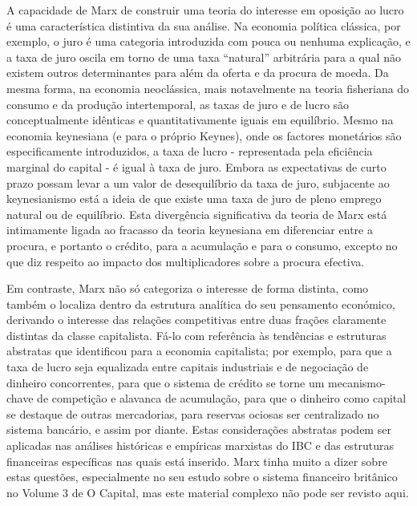  \par 
A capacidade de Marx de construir uma teoria do interesse em oposição ao lucro é uma característica distintiva da sua análise. Na economia política clássica, por exemplo, o juro é uma categoria introduzida com pouca ou nenhuma explicação, e a taxa de juro oscila em torno de uma taxa “natural” arbitrária para a qual não existem outros determinantes para além da oferta e da procura de moeda. Da mesma forma, na economia neoclássica, mais notavelmente na teoria fisheriana do consumo e da produção intertemporal, as taxas de juro e de lucro são conceptualmente idênticas e quantitativamente iguais em equilíbrio. Mesmo na economia keynesiana (e para o próprio Keynes), onde os factores monetários são especificamente introduzidos, a taxa de lucro - representada pela eficiência marginal do capital - é igual à taxa de juro. Embora as expectativas de curto prazo possam levar a um valor de desequilíbrio da taxa de juro, subjacente ao keynesianismo está a ideia de que existe uma taxa de juro de pleno emprego natural ou de equilíbrio. Esta divergência significativa da teoria de Marx está intimamente ligada ao fracasso da teoria keynesiana em diferenciar entre a procura, e portanto o crédito, para a acumulação e para o consumo, excepto no que diz respeito ao impacto dos multiplicadores sobre a procura efectiva.
 \par 
Em contraste, Marx não só categoriza o interesse de forma distinta, como também o localiza dentro da estrutura analítica do seu pensamento económico, derivando o interesse das relações competitivas entre duas frações claramente distintas da classe capitalista. Fá-lo com referência às tendências e estruturas abstratas que identificou para a economia capitalista; por exemplo, para que a taxa de lucro seja equalizada entre capitais industriais e de negociação de dinheiro concorrentes, para que o sistema de crédito se torne um mecanismo-chave de competição e alavanca de acumulação, para que o dinheiro como capital se destaque de outras mercadorias, para reservas ociosas ser centralizado no sistema bancário, e assim por diante. Estas considerações abstratas podem ser aplicadas nas análises históricas e empíricas marxistas do IBC e das estruturas financeiras específicas nas quais está inserido. Marx tinha muito a dizer sobre estas questões, especialmente no seu estudo sobre o sistema financeiro britânico no Volume {\color{blue}3} de O Capital, mas este material complexo não pode ser revisto aqui.
 \par 
